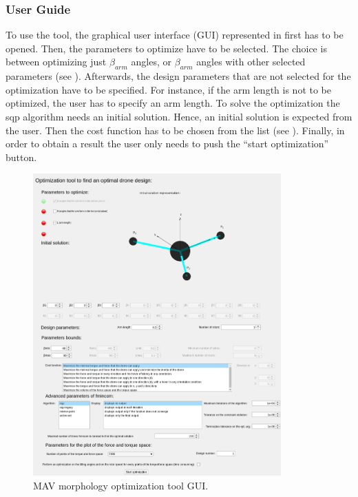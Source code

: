 \subsubsection{User Guide}
\label{sec:user_guide}
To use the tool, the graphical user interface (GUI) represented in 
first has to be opened. Then, the parameters to optimize have to be selected. The
choice is between optimizing just $\beta_{arm}$ angles, or $\beta_{arm}$ angles with other
selected parameters (see ). Afterwards, the design parameters that
are not selected for the optimization have to be specified. For instance, if the arm
length is not to be optimized, the user has to specify an arm length. To solve the
optimization the sqp algorithm needs an initial solution. Hence, an initial solution
is expected from the user. Then the cost function has to be chosen from the list
(see ). Finally, in order to obtain a result the user only needs to
push the “start optimization” button.

\begin{figure}[!h]
  \centering
  \includegraphics[width=0.85\textwidth]{images/gui.png}
  \caption{MAV morphology optimization tool GUI.}
  \label{fig:gui}
\end{figure}

